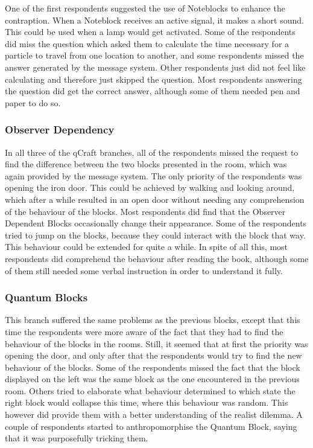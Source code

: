 \documentclass[11pt,twoside]{report} %
\begin{document}
One of the first respondents suggested the use of Noteblocks to enhance the contraption. When a Noteblock receives an active signal, it makes a short sound. This could be used when a lamp would get activated. Some of the respondents did miss the question which asked them to calculate the time necessary for a particle to travel from one location to another, and some respondents missed the answer generated by the message system. Other respondents just did not feel like calculating and therefore just skipped the question. Most respondents answering the question did get the correct answer, although some of them needed pen and paper to do so.

\subsubsection{Observer Dependency}

In all three of the qCraft branches, all of the respondents missed the request to find the difference between the two blocks presented in the room, which was again provided by the message system. The only priority of the respondents was opening the iron door. This could be achieved by walking and looking around, which after a while resulted in an open door without needing any comprehension of the behaviour of the blocks. Most respondents did find that the Observer Dependent Blocks occasionally change their appearance. Some of the respondents tried to jump on the blocks, because they could interact with the block that way. This behaviour could be extended for quite a while. In spite of all this, most respondents did comprehend the behaviour after reading the book, although some of them still needed some verbal instruction in order to understand it fully.

\subsubsection{Quantum Blocks}

This branch suffered the same problems as the previous blocks, except that this time the respondents were more aware of the fact that they had to find the behaviour of the blocks in the rooms. Still, it seemed that at first the priority was opening the door, and only after that the respondents would try to find the new behaviour of the blocks. Some of the respondents missed the fact that the block displayed on the left was the same block as the one encountered in the previous room. Others tried to elaborate what behaviour determined to which state the right block would collapse this time, where this behaviour was random. This however did provide them with a better understanding of the realist dilemma. A couple of respondents started to anthropomorphise the Quantum Block, saying that it was purposefully tricking them.
\end{document}
